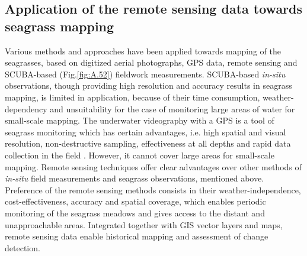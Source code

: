 \documentclass[11pt]{article}
\begin{document}
\subsection[Application of the remote sensing data towards seagrass mapping]{Application of the remote sensing data towards seagrass mapping}\label{page-15}

Various methods and approaches have been applied towards mapping of the seagrasses, based on
digitized aerial photographs, \ac{GPS} data, remote sensing and \ac{SCUBA}-based (Fig.\ref{fig:A.52}) fieldwork measurements.
\ac{SCUBA}-based \textit{in-situ} observations, though providing high resolution and accuracy results in seagrass
mapping, is limited in application, because of their time consumption, weather-dependency and
unsuitability for the case of monitoring large areas of water for small-scale mapping. 
The underwater videography with a \ac{GPS} is a tool of seagrass monitoring which has certain advantages, i.e.
high spatial and visual resolution, non-destructive sampling, effectiveness at all depths and rapid data
collection in the field \cite{Schultz08}\label{Schultz08}. 
However, it cannot cover large areas for small-scale mapping.
Remote sensing techniques offer clear advantages over other methods of \textit{in-situ} field measurements
and seagrass observations, mentioned above. Preference of the remote sensing methods consists in
their weather-independence, cost-effectiveness, accuracy and spatial coverage, which enables
periodic monitoring of the seagrass meadows and gives access to the distant and unapproachable
areas. 
Integrated together with \ac{GIS} vector layers and maps, remote sensing data enable historical
mapping \cite{Carter08,Ardizzone06}\label{Carter08} \label{Ardizzone06} and assessment of change detection.
\end{document}
